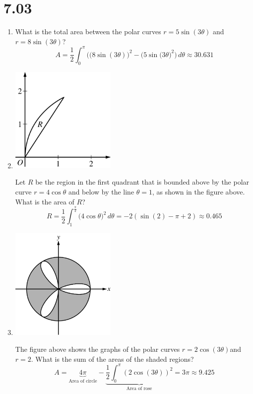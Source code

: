 \documentclass[12pt]{article}
\begin{document}
\section*{7.03}
\begin{enumerate}
	\item What is the total area between the polar curves $r = 5 \sin(3\theta)$ and $r = 8 \sin(3\theta)$?
	      $$A = \frac{1}{2} \int_{0}^{\pi} \bigg(\big(8\sin(3\theta))^2 - \big(5\sin(3\theta\big)^2\bigg)\, d\theta \approx \boxed{30.631}$$
	\item 
	      \begin{center}
	      	\includegraphics[width=2in]{7.032.png}
	      \end{center}
	      Let $R$ be the region in the first quadrant that is bounded above by the polar curve $r=4\cos \theta$ and below by the line $\theta=1$, as shown in the figure above. What is the area of $R$?
	      $$R = \frac{1}{2}\int_{1}^{\frac{\pi}{2}}\big(4\cos\theta\big)^2\, d\theta =-2(\sin(2)-\pi+2) \approx \boxed{0.465}$$
	\item 
	      \begin{center}
	      	\includegraphics[width = 2in]{7.033.png}
	      \end{center}
	      The figure above shows the graphs of the polar curves $r=2\cos(3\theta)$and $r=2$. What is the sum of the areas of the shaded regions?
	      $$A=\underbrace{4\pi}_{\text{Area of circle}} - \underbrace{\frac{1}{2}\int_{0}^{\pi} (2\cos(3\theta))^2}_{\text{Area of rose}} = 3\pi \approx \boxed{9.425}$$

\end{enumerate}
\end{document}
